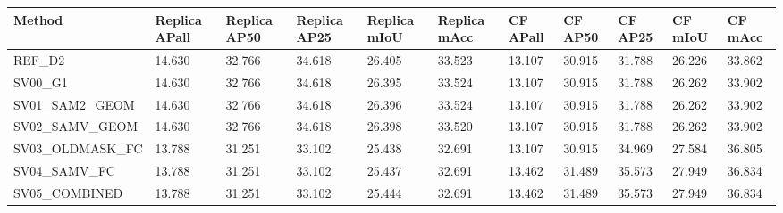 \begin{tabular}{lllllllllll}
\toprule
Method & Replica APall & Replica AP50 & Replica AP25 & Replica mIoU & Replica mAcc & CF APall & CF AP50 & CF AP25 & CF mIoU & CF mAcc \\
\midrule
REF\_D2 & 14.630 & 32.766 & 34.618 & 26.405 & 33.523 & 13.107 & 30.915 & 31.788 & 26.226 & 33.862 \\
SV00\_G1 & 14.630 & 32.766 & 34.618 & 26.395 & 33.524 & 13.107 & 30.915 & 31.788 & 26.262 & 33.902 \\
SV01\_SAM2\_GEOM & 14.630 & 32.766 & 34.618 & 26.396 & 33.524 & 13.107 & 30.915 & 31.788 & 26.262 & 33.902 \\
SV02\_SAMV\_GEOM & 14.630 & 32.766 & 34.618 & 26.398 & 33.520 & 13.107 & 30.915 & 31.788 & 26.262 & 33.902 \\
SV03\_OLDMASK\_FC & 13.788 & 31.251 & 33.102 & 25.438 & 32.691 & 13.107 & 30.915 & 34.969 & 27.584 & 36.805 \\
SV04\_SAMV\_FC & 13.788 & 31.251 & 33.102 & 25.437 & 32.691 & 13.462 & 31.489 & 35.573 & 27.949 & 36.834 \\
SV05\_COMBINED & 13.788 & 31.251 & 33.102 & 25.444 & 32.691 & 13.462 & 31.489 & 35.573 & 27.949 & 36.834 \\
\bottomrule
\end{tabular}
